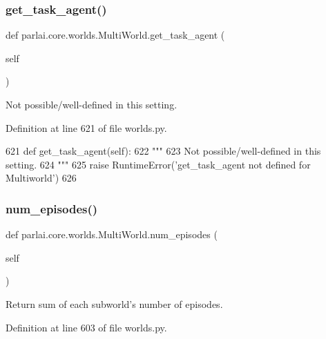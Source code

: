 \subsubsection{\texorpdfstring{get\+\_\+task\+\_\+agent()}{get\_task\_agent()}}
{\footnotesize\ttfamily def parlai.\+core.\+worlds.\+Multi\+World.\+get\+\_\+task\+\_\+agent (\begin{DoxyParamCaption}\item[{}]{self }\end{DoxyParamCaption})}

\begin{DoxyVerb}Not possible/well-defined in this setting.
\end{DoxyVerb}
 

Definition at line 621 of file worlds.\+py.


\begin{DoxyCode}
621     \textcolor{keyword}{def }get\_task\_agent(self):
622         \textcolor{stringliteral}{"""}
623 \textcolor{stringliteral}{        Not possible/well-defined in this setting.}
624 \textcolor{stringliteral}{        """}
625         \textcolor{keywordflow}{raise} RuntimeError(\textcolor{stringliteral}{'get\_task\_agent not defined for Multiworld'})
626 
\end{DoxyCode}
\mbox{\label{classparlai_1_1core_1_1worlds_1_1MultiWorld_a3efde7408bd94052b0a4880aefbc5d0a}} 
\subsubsection{\texorpdfstring{num\+\_\+episodes()}{num\_episodes()}}
{\footnotesize\ttfamily def parlai.\+core.\+worlds.\+Multi\+World.\+num\+\_\+episodes (\begin{DoxyParamCaption}\item[{}]{self }\end{DoxyParamCaption})}

\begin{DoxyVerb}Return sum of each subworld's number of episodes.
\end{DoxyVerb}
 

Definition at line 603 of file worlds.\+py.


